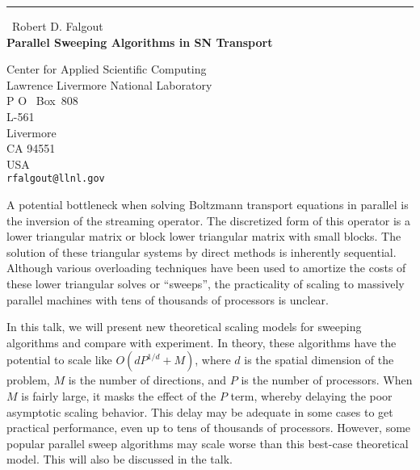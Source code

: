 \documentclass{report}
\begin{document}
\begin{center}
\rule{6in}{1pt} \
{\large Robert D. Falgout \\
{\bf Parallel Sweeping Algorithms in SN Transport}}

Center for Applied Scientific Computing \\ Lawrence Livermore National Laboratory \\ P O ~Box~808 \\ L-561 \\ Livermore \\ CA 94551 \\ USA
\\
{\tt rfalgout@llnl.gov}\end{center}

A potential bottleneck when solving Boltzmann transport equations in parallel is
the inversion of the streaming operator. The discretized form of this operator
is a lower triangular matrix or block lower triangular matrix with small blocks.
The solution of these triangular systems by direct methods is inherently
sequential. Although various overloading techniques have been used to amortize
the costs of these lower triangular solves or ``sweeps'', the practicality of
scaling to massively parallel machines with tens of thousands of processors is
unclear.

In this talk, we will present new theoretical scaling models for sweeping
algorithms and compare with experiment. In theory, these algorithms have the
potential to scale like $O(dP^{1/d} + M)$, where $d$ is the spatial dimension of
the problem, $M$ is the number of directions, and $P$ is the number of
processors. When $M$ is fairly large, it masks the effect of the $P$ term,
whereby delaying the poor asymptotic scaling behavior. This delay may be
adequate in some cases to get practical performance, even up to tens of
thousands of processors. However, some popular parallel sweep algorithms may
scale worse than this best-case theoretical model. This will also be discussed
in the talk.
\end{document}

